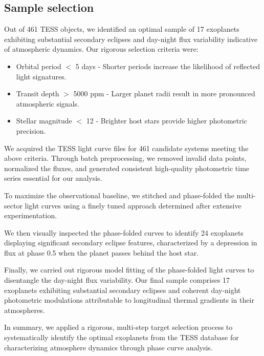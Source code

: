 \documentclass{article}
\begin{document}
\subsection{Sample selection}

Out of 461 TESS objects, we identified an optimal sample of 17 exoplanets exhibiting substantial secondary eclipses and day-night flux variability indicative of atmospheric dynamics. Our rigorous selection criteria were:

\begin{itemize}
    \item Orbital period $<$ 5 days - Shorter periods increase the likelihood of reflected light signatures.
    
    \item Transit depth $>$ 5000 ppm - Larger planet radii result in more pronounced atmospheric signals.

    \item Stellar magnitude $<$ 12 - Brighter host stars provide higher photometric precision.
    
\end{itemize}

We acquired the TESS light curve files for 461 candidate systems meeting the above criteria. Through batch preprocessing, we removed invalid data points, normalized the fluxes, and generated consistent high-quality photometric time series essential for our analysis.

To maximize the observational baseline, we stitched and phase-folded the multi-sector light curves using a finely tuned approach determined after extensive experimentation.

We then visually inspected the phase-folded curves to identify 24 exoplanets displaying significant secondary eclipse features, characterized by a depression in flux at phase 0.5 when the planet passes behind the host star.

Finally, we carried out rigorous model fitting of the phase-folded light curves to disentangle the day-night flux variability. Our final sample comprises 17 exoplanets exhibiting substantial secondary eclipses and coherent day-night photometric modulations attributable to longitudinal thermal gradients in their atmospheres.

In summary, we applied a rigorous, multi-step target selection process to systematically identify the optimal exoplanets from the TESS database for characterizing atmosphere dynamics through phase curve analysis.
\end{document}
